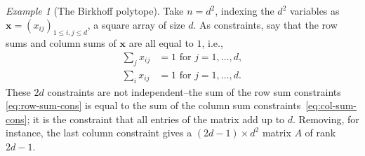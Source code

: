 \documentclass{amsbook}
\newcommand{\xx}{\mathbf x}
\theoremstyle{definition}
\theoremstyle{remark}
\newtheorem{example}[theorem]{Example}
\begin{document}
\begin{example}[The Birkhoff polytope]
  \label{example:birkhoff}
  Take $n=d^2$, indexing the $d^2$ variables as $\xx=(x_{ij})_{1\leq i,j\leq d}$, a square array of size $d$.
  As constraints, say that the row sums and column sums of $\xx$ are all equal to $1$, i.e.,
  \begin{align}
    \tag{R}
    \label{eq:row-sum-cons}
    \sum_j x_{ij} &= 1 \text{ for } j=1,\dotsc,d,\\
    \tag{C}
    \label{eq:col-sum-cons}
    \sum_i x_{ij} &= 1 \text{ for } j=1,\dotsc,d.
  \end{align}
  These $2d$ constraints are not independent--the sum of the row sum constraints \eqref{eq:row-sum-cons} is equal to the sum of the column sum constraints~\eqref{eq:col-sum-cons}; it is the constraint that all entries of the matrix add up to $d$.
  Removing, for instance, the last column constraint gives a $(2d-1)\times d^2$ matrix $A$ of rank $2d-1$.


\end{example}
\end{document}
